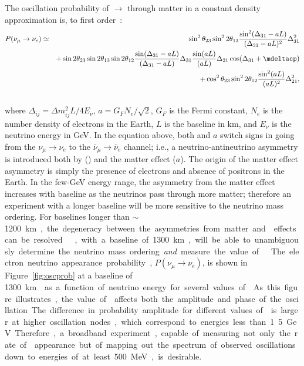 The oscillation probability of \numu $\rightarrow$ \nue through matter in a constant density
approximation is,  %
to first order~\cite{Nunokawa:2007qh}:
%
\begin{eqnarray}
P(\nu_\mu \rightarrow \nu_e) & \simeq & \sin^2 \theta_{23} \sin^2 2 \theta_{13} 
\frac{ \sin^2(\Delta_{31} - aL)}{(\Delta_{31}-aL)^2} \Delta_{31}^2\\ \nonumber
& & + \sin 2 \theta_{23} \sin 2 \theta_{13} \sin 2 \theta_{12} \frac{ \sin(\Delta_{31} - aL)}{(\Delta_{31}-aL)} \Delta_{31} \frac{\sin(aL)}{(aL)} \Delta_{21} \cos (\Delta_{31} + \mdeltacp)\\ \nonumber
& & + \cos^2 \theta_{23} \sin^2 2 \theta_{12} \frac {\sin^2(aL)}{(aL)^2} \Delta_{21}^2, \\ \nonumber
\label{eqn:appprob}
\end{eqnarray}
where $\Delta_{ij} = \Delta m^2_{ij} L/4E_\nu$, $a = G_FN_e/\sqrt{2}$, $G_F$ is the Fermi constant, $N_e$ is the number density of electrons in the Earth, $L$ is the baseline in km, and $E_\nu$ is the neutrino energy in GeV. 
In the equation above, both \deltacp and $a$ 
switch signs in going from the
$\nu_\mu \to \nu_e$ to the $\bar{\nu}_\mu \to \bar{\nu}_e$ channel; i.e.,
a neutrino-antineutrino asymmetry is introduced both by  (\deltacp)
and the matter effect ($a$). The origin of the matter effect asymmetry 
is simply the presence of electrons and absence of positrons in the Earth.  
In the few-GeV energy range, the asymmetry from the matter effect increases with baseline as the neutrinos
pass through more matter; therefore an experiment with a longer baseline will be
more sensitive to the neutrino mass ordering. For baselines longer than 
$\sim$\SI{1200}\km, the degeneracy between the asymmetries from matter
and  effects can be resolved~\cite{Bass:2013vcg}. , with a baseline of  \SI{1300}{\km}, 
will be able to unambiguously
determine the neutrino mass ordering \textit{and} measure the value of \deltacp~\cite{Diwan:2004bt}. 

The electron neutrino appearance probability, $P(\nu_\mu \rightarrow \nu_e)$, 
is shown in 
Figure~\ref{fig:oscprob} at a baseline of \SI{1300}\km{} as a function of neutrino 
energy for several values of \deltacp. As this figure illustrates, the value 
of \deltacp affects both the amplitude and phase of
the oscillation. The difference in probability amplitude
for different values of \deltacp is larger at higher oscillation nodes, which 
correspond to energies less than 1.5~GeV. Therefore, a broadband experiment, 
capable of measuring not only the rate of \nue appearance but of mapping out the 
spectrum of observed oscillations down to energies of at least 500~MeV, is desirable. 

